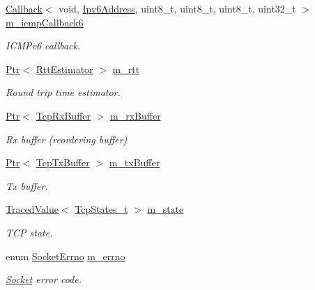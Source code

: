 \begin{DoxyCompactItemize}
\hyperlink{classns3_1_1Callback}{Callback}$<$ void, \hyperlink{classns3_1_1Ipv6Address}{Ipv6\+Address}, uint8\+\_\+t, uint8\+\_\+t, uint8\+\_\+t, uint32\+\_\+t $>$ \hyperlink{classns3_1_1TcpSocketBase_a75aca0603de58d7db7c0fa7daab34064}{m\+\_\+icmp\+Callback6}
\begin{DoxyCompactList}\small\item\em I\+C\+M\+Pv6 callback. \end{DoxyCompactList}\item 
\hyperlink{classns3_1_1Ptr}{Ptr}$<$ \hyperlink{classns3_1_1RttEstimator}{Rtt\+Estimator} $>$ \hyperlink{classns3_1_1TcpSocketBase_a5fc75bf06fd5382244cf1d60652cf58d}{m\+\_\+rtt}
\begin{DoxyCompactList}\small\item\em Round trip time estimator. \end{DoxyCompactList}\item 
\hyperlink{classns3_1_1Ptr}{Ptr}$<$ \hyperlink{classns3_1_1TcpRxBuffer}{Tcp\+Rx\+Buffer} $>$ \hyperlink{classns3_1_1TcpSocketBase_a0163894148e5a70e6bd89970a1483fae}{m\+\_\+rx\+Buffer}
\begin{DoxyCompactList}\small\item\em Rx buffer (reordering buffer) \end{DoxyCompactList}\item 
\hyperlink{classns3_1_1Ptr}{Ptr}$<$ \hyperlink{classns3_1_1TcpTxBuffer}{Tcp\+Tx\+Buffer} $>$ \hyperlink{classns3_1_1TcpSocketBase_a4a1b53982ffd851bd07ab8d5005c130e}{m\+\_\+tx\+Buffer}
\begin{DoxyCompactList}\small\item\em Tx buffer. \end{DoxyCompactList}\item 
\hyperlink{classns3_1_1TracedValue}{Traced\+Value}$<$ \hyperlink{group__tcp_ga3929cdb47bdf159657fa24054aa5ca03}{Tcp\+States\+\_\+t} $>$ \hyperlink{classns3_1_1TcpSocketBase_a5db6f29272f23546e23320c06a681f3e}{m\+\_\+state}
\begin{DoxyCompactList}\small\item\em T\+CP state. \end{DoxyCompactList}\item 
enum \hyperlink{classns3_1_1Socket_ada1328c5ae0c28cb2a982caf8f6d6cca}{Socket\+Errno} \hyperlink{classns3_1_1TcpSocketBase_a592901b6c992843533af1b7c1c7f9474}{m\+\_\+errno}
\begin{DoxyCompactList}\small\item\em \hyperlink{classns3_1_1Socket}{Socket} error code. \end{DoxyCompactList}\item 

\end{DoxyCompactItemize}
